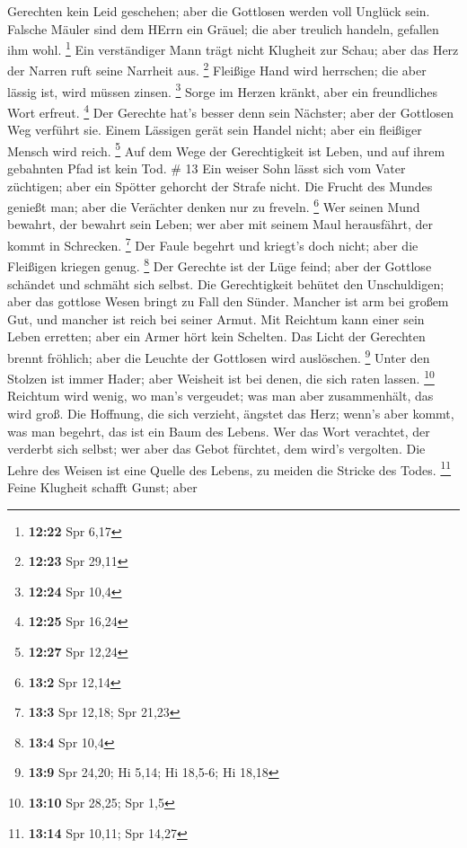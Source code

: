 Gerechten kein Leid geschehen; aber die Gottlosen werden voll Unglück
sein.  Falsche Mäuler sind dem HErrn ein Gräuel; die aber
treulich handeln, gefallen ihm wohl. \footnote{\textbf{12:22} Spr 6,17}
 Ein verständiger Mann trägt nicht Klugheit zur Schau; aber
das Herz der Narren ruft seine Narrheit aus. \footnote{\textbf{12:23}
  Spr 29,11}  Fleißige Hand wird herrschen; die aber lässig
ist, wird müssen zinsen. \footnote{\textbf{12:24} Spr 10,4}
 Sorge im Herzen kränkt, aber ein freundliches Wort
erfreut. \footnote{\textbf{12:25} Spr 16,24}  Der Gerechte
hat's besser denn sein Nächster; aber der Gottlosen Weg verführt sie.
 Einem Lässigen gerät sein Handel nicht; aber ein fleißiger
Mensch wird reich. \footnote{\textbf{12:27} Spr 12,24}  Auf
dem Wege der Gerechtigkeit ist Leben, und auf ihrem gebahnten Pfad ist
kein Tod. \# 13  Ein weiser Sohn lässt sich vom Vater
züchtigen; aber ein Spötter gehorcht der Strafe nicht.  Die
Frucht des Mundes genießt man; aber die Verächter denken nur zu freveln.
\footnote{\textbf{13:2} Spr 12,14}  Wer seinen Mund bewahrt,
der bewahrt sein Leben; wer aber mit seinem Maul herausfährt, der kommt
in Schrecken. \footnote{\textbf{13:3} Spr 12,18; Spr 21,23} 
Der Faule begehrt und kriegt's doch nicht; aber die Fleißigen kriegen
genug. \footnote{\textbf{13:4} Spr 10,4}  Der Gerechte ist
der Lüge feind; aber der Gottlose schändet und schmäht sich selbst.
 Die Gerechtigkeit behütet den Unschuldigen; aber das
gottlose Wesen bringt zu Fall den Sünder.  Mancher ist arm
bei großem Gut, und mancher ist reich bei seiner Armut.  Mit
Reichtum kann einer sein Leben erretten; aber ein Armer hört kein
Schelten.  Das Licht der Gerechten brennt fröhlich; aber die
Leuchte der Gottlosen wird auslöschen. \footnote{\textbf{13:9} Spr
  24,20; Hi 5,14; Hi 18,5-6; Hi 18,18}  Unter den Stolzen
ist immer Hader; aber Weisheit ist bei denen, die sich raten lassen.
\footnote{\textbf{13:10} Spr 28,25; Spr 1,5}  Reichtum wird
wenig, wo man's vergeudet; was man aber zusammenhält, das wird groß.
 Die Hoffnung, die sich verzieht, ängstet das Herz; wenn's
aber kommt, was man begehrt, das ist ein Baum des Lebens. 
Wer das Wort verachtet, der verderbt sich selbst; wer aber das Gebot
fürchtet, dem wird's vergolten.  Die Lehre des Weisen ist
eine Quelle des Lebens, zu meiden die Stricke des Todes. \footnote{\textbf{13:14}
  Spr 10,11; Spr 14,27}  Feine Klugheit schafft Gunst; aber
